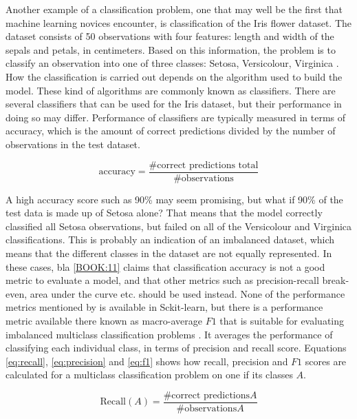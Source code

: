 	Another example of a classification problem, one that may well be the first that machine learning novices encounter, is classification of the Iris flower dataset. The dataset consists of 50 observations with four features: length and width of the sepals and petals, in centimeters. Based on this information, the problem is to classify an observation into one of three classes: Setosa, Versicolour, Virginica \cite{WEBSITE:5}.
	How the classification is carried out depends on the algorithm used to build the model. These kind of algorithms are commonly known as classifiers. There are several classifiers that can be used for the Iris dataset, but their performance in doing so may differ. Performance of classifiers are typically measured in terms of accuracy, which is the amount of correct predictions divided by the number of observations in the test dataset.

\begin{equation}
	\mbox{accuracy} = \frac{\mbox{\#correct predictions total}}{\mbox{\#observations}}
\end{equation}
	
	A high accuracy score such as 90\% may seem promising, but what if 90\% of the test data is made up of Setosa alone? That means that the model correctly classified all Setosa observations, but failed on all of the Versicolour and Virginica classifications. This is probably an indication of an imbalanced dataset, which means that the different classes in the dataset are not equally represented. In these cases, bla \ref{BOOK:11} claims that classification accuracy is not a good metric to evaluate a model, and that other metrics such as precision-recall break-even, area under the curve etc. should be used instead. None of the performance metrics mentioned by \cite{BOOK:11} is available in Sckit-learn, but there is a performance metric available there known as macro-average $F1$ that is suitable for evaluating imbalanced multiclass classification problems \cite{WEBSITE:25}. It averages the performance of classifying each individual class, in terms of precision and recall score. Equations \ref{eq:recall}, \ref{eq:precision} and \ref{eq:f1} shows how recall, precision and $F1$ scores are calculated for a multiclass classification problem on one if its classes $A$. 

\begin{equation} \label{eq:recall}
	\mbox{Recall}(A) = \frac{\mbox{\#correct predictions} A}{\mbox{\#observations} A}
\end{equation}


